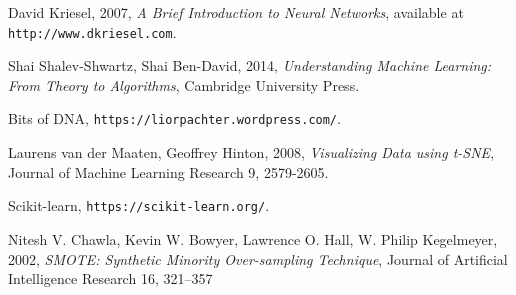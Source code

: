 \documentclass[12pt, twoside, letterpaper]{report}
\begin{document}
	\begin{thebibliography}{9}
		 David Kriesel, 2007, \textit{A Brief Introduction to Neural Networks}, available at \texttt{http://www.dkriesel.com}.

		 Shai Shalev-Shwartz, Shai Ben-David, 2014, \textit{Understanding Machine Learning: From Theory to Algorithms}, Cambridge University Press.
		
		 Bits of DNA, \texttt{https://liorpachter.wordpress.com/}.
		
		 Laurens van der Maaten, Geoffrey Hinton, 2008, \textit{Visualizing Data using t-SNE}, Journal of Machine Learning Research 9, 2579-2605.
		
		 Scikit-learn, \texttt{https://scikit-learn.org/}.
		
		 Nitesh V. Chawla, Kevin W. Bowyer, Lawrence O. Hall, W. Philip Kegelmeyer, 2002, \textit{SMOTE: Synthetic Minority Over-sampling Technique}, Journal of Artificial Intelligence Research 16, 321–357
		
	\end{thebibliography}
	
\end{document}
